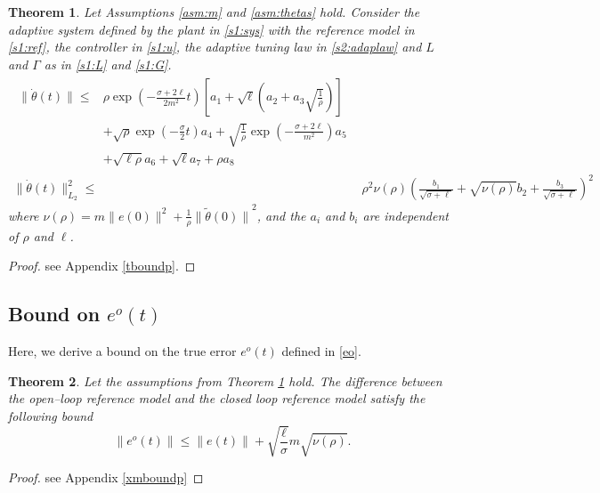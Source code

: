 \documentclass[10pt,journal]{IEEEtran}
\theoremstyle{plain}%
\newtheorem{thm}{Theorem}%
\theoremstyle{definition}
\newcommand{\be}[0]{\begin{equation}}
\newcommand{\ee}[0]{\end{equation}}
\newcommand{\norms}[1]{\lVert#1\rVert}
\newcommand{\normB}[0]{\norms}
\let\norm=\normB
\newcommand{\norml}[2]{\norm{#1}_{L_{#2}}}
\begin{document}
\begin{thm} \label{tbound}Let Assumptions \ref{asm:m} and \ref{asm:thetas} hold. Consider the adaptive system defined by the plant in \eqref{s1:sys} with the reference model in \eqref{s1:ref}, the controller in \eqref{s1:u}, the adaptive tuning law in \eqref{s2:adaplaw} and $L$ and $\Gamma$ as in \eqref{s1:L} and \eqref{s1:G}.
\begin{align}
\begin{split}\label{t1bound}
\norm{\dot\theta(t)}   \leq &\rho \exp{ \left(-\tfrac{\sigma+2\ell}{2m^2}t\right)} \left[ a_1 +\sqrt{\ell}\left( a_2 + a_3 \sqrt{\tfrac{1}{\rho}}\right)  \right] \\ &+ \sqrt{\rho} \exp{\left( -\tfrac{\sigma}{2} t\right)} a_4 +\sqrt{\tfrac 1 \rho} \exp{ \left(-\tfrac{\sigma+2\ell}{m^2}\right)} a_5 \\
&+ \sqrt{\ell\rho} a_6 + \sqrt{\ell} a_7 + \rho a_8
\end{split} \\ \label{tbound2}
\norml{\dot\theta(t)}{2} ^2 \leq  &  \rho^2 \nu(\rho) \left(\frac{b_1}{\sqrt{\sigma+\ell}} + \sqrt{\nu(\rho)} b_2 + \frac{b_3}{\sqrt{\sigma+\ell}} \right)^2
\end{align}
where $\nu(\rho)=m \norm{e(0)}^2 +  \frac {1} {\rho}{\norm{\tilde\theta(0)}}^2$, and the $a_i$ and $b_i$ are independent of $\rho$ and $\ell$.
\end{thm}
\begin{proof} see Appendix \ref{tboundp}.\end{proof}



\subsection{Bound on $e^o(t)$}
Here, we derive a bound on  the true error $e^o(t)$ defined in \eqref{eo}.

\begin{thm} \label{xmbound} Let the assumptions from Theorem \ref{tbound} hold. The difference between the open--loop reference model and the closed loop reference model satisfy the following bound
\be
\norm{e^o(t)} \leq \norm{e(t)} +  \sqrt{\frac \ell \sigma} m\sqrt{\nu(\rho)}.
\ee
\end{thm}
\begin{proof}see Appendix \ref{xmboundp}\end{proof}
\end{document}
